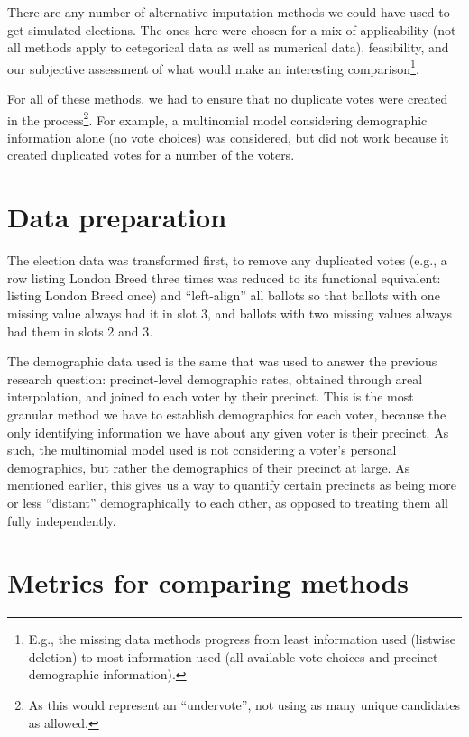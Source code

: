 \documentclass[12pt,twoside]{reedthesis}
\begin{document}
There are any number of alternative imputation methods we could have used to get simulated elections. The ones here were chosen for a mix of applicability (not all methods apply to cetegorical data as well as numerical data), feasibility, and our subjective assessment of what would make an interesting comparison\footnote{E.g., the missing data methods progress from least information used (listwise deletion) to most information used (all available vote choices and precinct demographic information).}.

For all of these methods, we had to ensure that no duplicate votes were created in the process\footnote{As this would represent an ``undervote'', not using as many unique candidates as allowed.}. For example, a multinomial model considering demographic information alone (no vote choices) was considered, but did not work because it created duplicated votes for a number of the voters.

\hypertarget{data-preparation}{%
\section{Data preparation}\label{data-preparation}}

The election data was transformed first, to remove any duplicated votes (e.g., a row listing London Breed three times was reduced to its functional equivalent: listing London Breed once) and ``left-align'' all ballots so that ballots with one missing value always had it in slot 3, and ballots with two missing values always had them in slots 2 and 3.

The demographic data used is the same that was used to answer the previous research question: precinct-level demographic rates, obtained through areal interpolation, and joined to each voter by their precinct. This is the most granular method we have to establish demographics for each voter, because the only identifying information we have about any given voter is their precinct. As such, the multinomial model used is not considering a voter's personal demographics, but rather the demographics of their precinct at large. As mentioned earlier, this gives us a way to quantify certain precincts as being more or less ``distant'' demographically to each other, as opposed to treating them all fully independently.

\hypertarget{metrics-for-comparing-methods}{%
\section{Metrics for comparing methods}\label{metrics-for-comparing-methods}}
\end{document}
